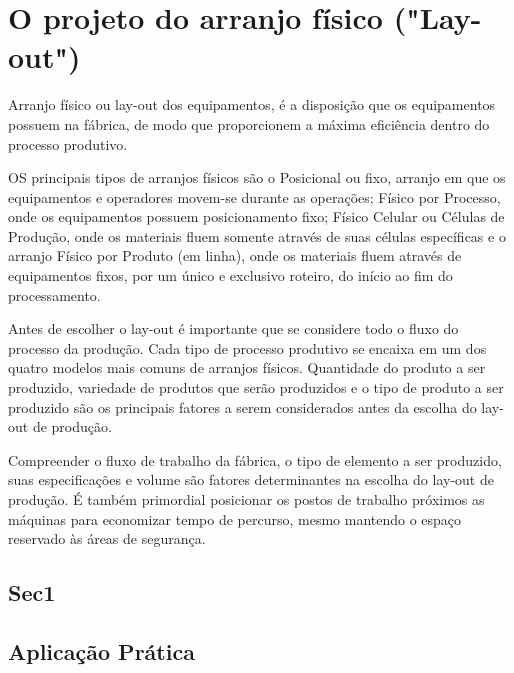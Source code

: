 \chapter{O projeto do arranjo físico ("Lay-out")} 
\label{chap:projeto_do_arranjo} 
Arranjo físico ou lay-out dos equipamentos, é a disposição que os equipamentos possuem na fábrica, de modo que proporcionem a máxima eficiência dentro do processo produtivo.

OS principais tipos de arranjos físicos são o Posicional ou fixo, arranjo em que os equipamentos e operadores movem-se durante as operações; Físico por Processo, onde os equipamentos possuem posicionamento fixo; Físico Celular ou Células de Produção, onde os materiais fluem somente através de suas células específicas e o arranjo Físico por Produto (em linha), onde os materiais fluem através de equipamentos fixos, por um único e exclusivo roteiro, do início ao fim do processamento.

Antes de escolher o lay-out é importante que se considere todo o fluxo do processo da produção. Cada tipo de processo produtivo se encaixa em um dos quatro modelos mais comuns de arranjos físicos. Quantidade do produto a ser produzido, variedade de produtos que serão produzidos e o tipo de produto a ser produzido são os principais fatores a serem considerados antes da escolha do lay-out de produção.

Compreender o fluxo de trabalho da fábrica, o tipo de elemento a ser produzido, suas especificações  e volume são fatores determinantes na escolha do lay-out de produção. É também primordial posicionar os postos de trabalho próximos as máquinas para economizar tempo de percurso, mesmo mantendo o espaço reservado às áreas de segurança.
 


\section{Sec1} 
\label{sec:projeto_do_arranjo_sec1} 
 
\section{Aplicação Prática} 
\label{sec:projeto_do_arranjo_aplicacao}
